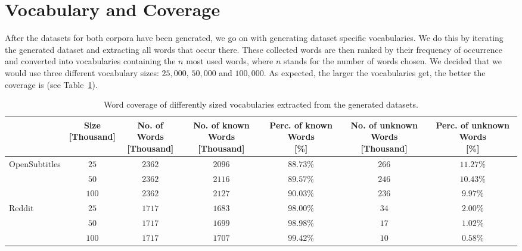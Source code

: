 \section{Vocabulary and Coverage}
\label{data:word_coverage}
After the datasets for both corpora have been generated, we go on with generating dataset specific vocabularies. We do this by iterating the generated dataset and extracting all words that occur there. These collected words are then ranked by their frequency of occurrence and converted into vocabularies containing the $n$ most used words, where $n$ stands for the number of words chosen. We decided that we would use three different vocabulary sizes: $25,000$, $50,000$ and $100,000$. As expected, the larger the vocabularies get, the better the coverage is (see Table~\ref{tbl:data:split:corpus:analyze}).
\\
\begin{table}[H]
	\begin{adjustbox}{max width=\textwidth}
		\centering
		\begin{tabular}{lcccccc}
			\toprule
			&\specialcell{Size\\ {[Thousand]}}
			&\specialcell{No. of Words\\ {[Thousand]}}
			&\specialcell{No. of known Words\\ {[Thousand]}}
			&\specialcell{Perc. of known Words \\ {[\%]}}
			&\specialcell{No. of unknown Words \\ {[Thousand]}}
			&\specialcell{Perc. of unknown Words \\ {[\%]}}\\
			\midrule
			OpenSubtitles	&$25$		&$2362$	&$2096$	&$88.73\%$ &$266$	&$11.27\%$\\
							&$50$		&$2362$	&$2116$	&$89.57\%$	&$246$	&$10.43\%$\\
							&$100$	&$2362$	&$2127$	&$90.03\%$	&$236$	&$9.97\%$\\
			\midrule
			Reddit		&$25$		&$1717$	&$1683$	&$98.00\%$	&$34$		&$2.00\%$\\
						&$50$		&$1717$	&$1699$	&$98.98\%$	&$17$		&$1.02\%$\\
						&$100$	&$1717$	&$1707$	&$99.42\%$	&$10$		&$0.58\%$\\
			\bottomrule
		\end{tabular}
	\end{adjustbox}
	\caption{Word coverage of differently sized vocabularies extracted from the generated datasets.}
	\label{tbl:data:split:corpus:analyze}
\end{table}

